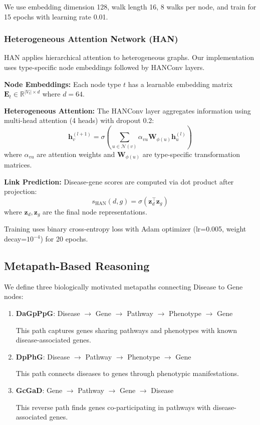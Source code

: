 \documentclass{article}
\newcommand{\vect}[1]{\mathbf{#1}}
\newcommand{\mat}[1]{\mathbf{#1}}
\newcommand{\set}[1]{\mathcal{#1}}
\newcommand{\real}{\mathbb{R}}
\begin{document}
We use embedding dimension 128, walk length 16, 8 walks per node, and train for 15 epochs with learning rate 0.01.

\subsubsection{Heterogeneous Attention Network (HAN)}

HAN \citep{wang2019heterogeneous} applies hierarchical attention to heterogeneous graphs. Our implementation uses type-specific node embeddings followed by HANConv layers.

\textbf{Node Embeddings:} Each node type $t$ has a learnable embedding matrix $\mat{E}_t \in \real^{|V_t| \times d}$ where $d = 64$.

\textbf{Heterogeneous Attention:} The HANConv layer aggregates information using multi-head attention (4 heads) with dropout 0.2:
\begin{equation}
    \vect{h}_v^{(l+1)} = \sigma\left(\sum_{u \in \set{N}(v)} \alpha_{vu} \mat{W}_{\phi(u)} \vect{h}_u^{(l)}\right)
\end{equation}
where $\alpha_{vu}$ are attention weights and $\mat{W}_{\phi(u)}$ are type-specific transformation matrices.

\textbf{Link Prediction:} Disease-gene scores are computed via dot product after projection:
\begin{equation}
    s_{\text{HAN}}(d, g) = \sigma\left(\vect{z}_d^\top \vect{z}_g\right)
\end{equation}
where $\vect{z}_d, \vect{z}_g$ are the final node representations.

Training uses binary cross-entropy loss with Adam optimizer (lr=0.005, weight decay=$10^{-4}$) for 20 epochs.

\subsection{Metapath-Based Reasoning}
\label{sec:metapath}

We define three biologically motivated metapaths connecting Disease to Gene nodes:

\begin{enumerate}
    \item \textbf{DaGpPpG}: Disease $\rightarrow$ Gene $\rightarrow$ Pathway $\rightarrow$ Phenotype $\rightarrow$ Gene

    This path captures genes sharing pathways and phenotypes with known disease-associated genes.

    \item \textbf{DpPhG}: Disease $\rightarrow$ Pathway $\rightarrow$ Phenotype $\rightarrow$ Gene

    This path connects diseases to genes through phenotypic manifestations.

    \item \textbf{GcGaD}: Gene $\rightarrow$ Pathway $\rightarrow$ Gene $\rightarrow$ Disease

    This reverse path finds genes co-participating in pathways with disease-associated genes.
\end{enumerate}
\end{document}
